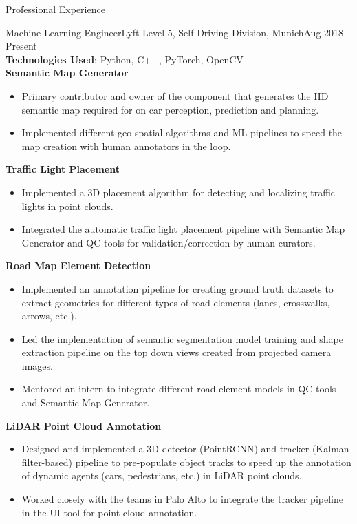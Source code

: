 \documentclass[]{mcdowellcv}
\begin{document}
	
	\begin{cvsection}{Professional Experience}
		
		\begin{cvsubsection}{Machine Learning Engineer}{Lyft Level 5, Self-Driving Division, Munich}{Aug 2018 -- Present}   
			\textit{ } \\
			\textbf{Technologies Used}: Python, C++, PyTorch, OpenCV \\
			\textbf{Semantic Map Generator}
			\begin{itemize}
				\item Primary contributor and owner of the component that generates the HD semantic map required for on car perception, prediction and planning.
				\item Implemented different geo spatial algorithms and ML pipelines to speed the map creation with human annotators in the loop.
			\end{itemize}
			
			\textbf{Traffic Light Placement}
			\begin{itemize}
				\item Implemented a 3D placement algorithm for detecting and localizing traffic lights in point clouds.
				\item Integrated the automatic traffic light placement pipeline with Semantic Map Generator and QC tools for validation/correction 
				by human curators.
			\end{itemize}
			
			\textbf{Road Map Element Detection}
			\begin{itemize}
				\item Implemented an annotation pipeline for creating ground truth datasets to extract geometries for different types of road elements (lanes, crosswalks, arrows, etc.).
				\item Led the implementation of semantic segmentation model training and shape extraction pipeline on the top down views created from projected camera images. 
				\item Mentored an intern to integrate different road element models in QC tools and Semantic Map Generator.
			\end{itemize}
			
			\textbf{LiDAR Point Cloud Annotation}
			\begin{itemize}
				\item Designed and implemented a 3D detector (PointRCNN) and tracker (Kalman filter-based) pipeline to pre-populate object tracks to speed up the annotation of dynamic agents (cars, pedestrians, etc.) in LiDAR point clouds.
				\item Worked closely with the teams in Palo Alto to integrate the tracker pipeline in the UI tool for point cloud annotation.
			\end{itemize}
			

\end{cvsubsection}
\end{cvsection}
\end{document}
